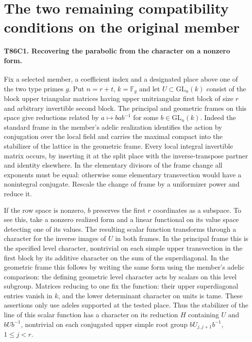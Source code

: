 \section{The two remaining compatibility conditions on the original member}

\paragraph{T86C1. Recovering the parabolic from the character on a nonzero form.}
Fix a selected member, a coefficient index and a designated place above
one of the two type primes $g$. Put $n=r+t$, $k=\mathbb F_g$ and let
$U\subset\mathrm{GL}_n(k)$ consist of the block upper triangular
matrices having upper unitriangular first block of size $r$ and
arbitrary invertible second block. The principal and geometric frames
on this space give reductions related by $a\mapsto bab^{-1}$ for some
$b\in\mathrm{GL}_n(k)$. Indeed the standard frame in the member's
adelic realization identifies the action by conjugation over the local
field and carries the maximal compact into the stabilizer of the
lattice in the geometric frame. Every local integral invertible
matrix occurs, by inserting it at the split place with the
inverse-transpose partner and identity elsewhere. In the elementary
divisors of the frame change all exponents must be equal: otherwise
some elementary transvection would have a nonintegral conjugate.
Rescale the change of frame by a uniformizer power and reduce it.

If the row space is nonzero, $b$ preserves the first $r$ coordinates
as a subspace. To see this, take a nonzero realized form and a
linear functional on its value space detecting one of its values.
The resulting scalar function transforms through a character for
the inverse images of $U$ in both frames. In the principal frame
this is the specified level character, nontrivial on each simple
upper transvection in the first block by its additive character
on the sum of the superdiagonal. In the geometric frame this follows
by writing the same form using the member's adelic comparison:
the defining geometric level character acts by scalars on this
level subgroup. Matrices reducing to one fix the function: their
upper superdiagonal entries vanish in $k$, and the lower
determinant character on units is tame. These assertions only
use adeles supported at the tested place. Thus the stabilizer of
the line of this scalar function has a character on its reduction
$H$ containing $U$ and $bUb^{-1}$, nontrivial on each conjugated
upper simple root group $bU_{j,j+1}b^{-1}$, $1\leq j<r$.

